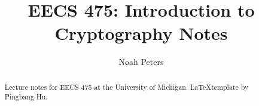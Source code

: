 \documentclass[a4paper]{report}
\author{Noah Peters}
\title{EECS 475: Introduction to Cryptography Notes}
\begin{document}
\maketitle

\begin{abstract}
	Lecture notes for EECS 475 at the University of Michigan.
	\LaTeX   template by Pingbang Hu.
\end{abstract}

\newpage

\tableofcontents


\newpage
\appendix
\appendixpage



\newpage
\printbibliography
\end{document}
